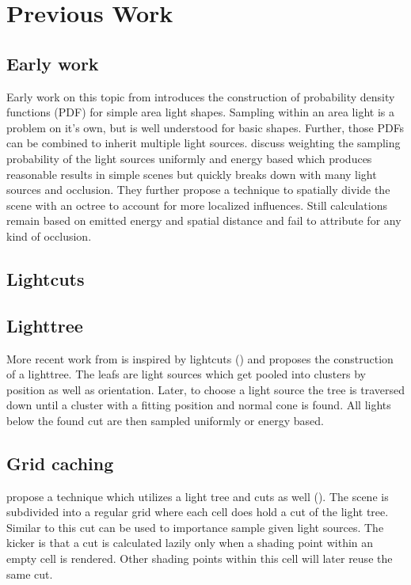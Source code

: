 \chapter{Previous Work}
\label{ch:Prev}

\section{Early work}

Early work on this topic from \cite{Shirley:1996:MCT:226150.226151} introduces the construction of probability density functions (PDF) for simple area light shapes. Sampling within an area light is a problem on it's own, but is well understood for basic shapes. Further, those PDFs can be combined to inherit multiple light sources. \cite{Shirley:1996:MCT:226150.226151} discuss weighting the sampling probability of the light sources uniformly and energy based which produces reasonable results in simple scenes but quickly breaks down with many light sources and occlusion. They further propose a technique to spatially divide the scene with an octree to account for more localized influences. Still calculations remain based on emitted energy %
and spatial distance and fail to attribute for any kind of occlusion.

\section{Lightcuts}

\section{Lighttree}

More recent work from \cite{Estevez:2017:ISM:3084363.3085028} is inspired by lightcuts (\cite{Walter2005LightcutsAS}) and proposes the construction of a lighttree. The leafs are light sources which get pooled into clusters by position as well as orientation. Later, to choose a  light source the tree is traversed down until a cluster with a fitting position and normal cone is found. All lights below the found cut are then sampled uniformly or energy based.

\section{Grid caching}

\cite{Vevoda:2016:ADI:3005274.3005283} propose a technique which utilizes a light tree and cuts as well (\cite{Walter2005LightcutsAS}). The scene is subdivided into a regular grid where each cell does hold a cut of the light tree. Similar to \cite{Estevez:2017:ISM:3084363.3085028} this cut can be used to importance sample given light sources. The kicker is that a cut is calculated lazily only when a shading point within an empty cell is rendered. Other shading points within this cell will later reuse the same cut.

